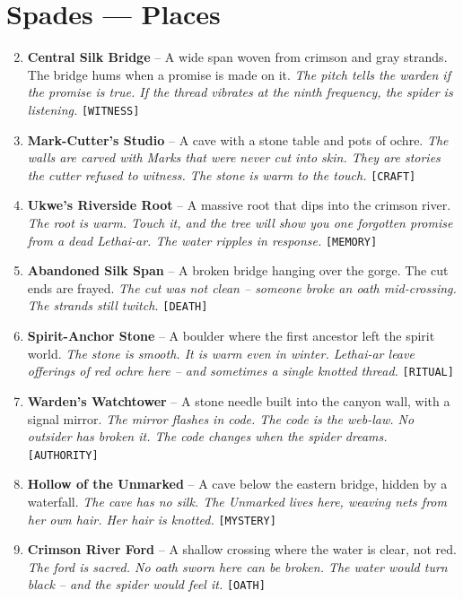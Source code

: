 \section*{Spades --- Places}
\label{sec:lethaiar-places}
\begin{enumerate}
\setcounter{enumi}{1}
\item \textbf{Central Silk Bridge} -- A wide span woven from crimson and gray strands. The bridge hums when a promise is made on it.
  \hfill \textit{The pitch tells the warden if the promise is true. If the thread vibrates at the ninth frequency, the spider is listening.} \texttt{[WITNESS]}
\item \textbf{Mark-Cutter's Studio} -- A cave with a stone table and pots of ochre.
  \hfill \textit{The walls are carved with Marks that were never cut into skin. They are stories the cutter refused to witness. The stone is warm to the touch.} \texttt{[CRAFT]}
\item \textbf{Ukwe's Riverside Root} -- A massive root that dips into the crimson river.
  \hfill \textit{The root is warm. Touch it, and the tree will show you one forgotten promise from a dead Lethai-ar. The water ripples in response.} \texttt{[MEMORY]}
\item \textbf{Abandoned Silk Span} -- A broken bridge hanging over the gorge. The cut ends are frayed.
  \hfill \textit{The cut was not clean -- someone broke an oath mid-crossing. The strands still twitch.} \texttt{[DEATH]}
\item \textbf{Spirit-Anchor Stone} -- A boulder where the first ancestor left the spirit world.
  \hfill \textit{The stone is smooth. It is warm even in winter. Lethai-ar leave offerings of red ochre here -- and sometimes a single knotted thread.} \texttt{[RITUAL]}
\item \textbf{Warden's Watchtower} -- A stone needle built into the canyon wall, with a signal mirror.
  \hfill \textit{The mirror flashes in code. The code is the web-law. No outsider has broken it. The code changes when the spider dreams.} \texttt{[AUTHORITY]}
\item \textbf{Hollow of the Unmarked} -- A cave below the eastern bridge, hidden by a waterfall.
  \hfill \textit{The cave has no silk. The Unmarked lives here, weaving nets from her own hair. Her hair is knotted.} \texttt{[MYSTERY]}
\item \textbf{Crimson River Ford} -- A shallow crossing where the water is clear, not red.
  \hfill \textit{The ford is sacred. No oath sworn here can be broken. The water would turn black -- and the spider would feel it.} \texttt{[OATH]}

\end{enumerate}
